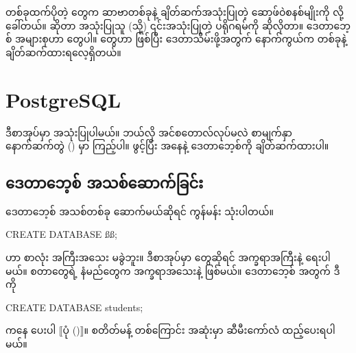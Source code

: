 တစ်ခုထက်ပိုတဲ့  တွေက ဆာဗာတစ်ခုနဲ့ ချိတ်ဆက်အသုံးပြုတဲ့ ဆော့ဖ်ဝဲစနစ်မျိုးကို   လို့ ခေါ်တယ်။  ဆိုတာ အသုံးပြုသူ  (သို့) ၎င်းအသုံးပြုတဲ့ ပရိုဂရမ်ကို ဆိုလိုတာ။ ဒေတာဘေ့စ်  အများစုဟာ  တွေပါ။  တွေဟာ  ဖြစ်ပြီး ဒေတာသိမ်းဖို့အတွက် နောက်ကွယ်က  တစ်ခုနဲ့ ချိတ်ဆက်ထားရလေ့ရှိတယ်။ 


\section{PostgreSQL}
ဒီစာအုပ်မှာ  အသုံးပြုပါမယ်။  ဘယ်လို အင်စတောလ်လုပ်မလဲ စာမျက်နှာ \fRefNo{\pageref{apdx3}} နောက်ဆက်တွဲ (\fRefNo{\ref{apdx3}}) မှာ ကြည့်ပါ။  ဖွင့်ပြီး  အနေနဲ့  ဒေတာဘေ့စ်ကို ချိတ်ဆက်ထားပါ။

\subsection*{ဒေတာဘေ့စ် အသစ်ဆောက်ခြင်း}
ဒေတာဘေ့စ် အသစ်တစ်ခု ဆောက်မယ်ဆိုရင်   ကွန်မန်း သုံးပါတယ်။  
%
\begin{sql}
CREATE DATABASE ßß;
\end{sql}
%
 ဟာ စာလုံး အကြီးအသေး မခွဲဘူး။ ဒီစာအုပ်မှာ  တွေဆိုရင် အက္ခရာအကြီးနဲ့ ရေးပါမယ်။  စတာတွေရဲ့ နံမည်တွေက အက္ခရာအသေးနဲ့ ဖြစ်မယ်။
 ဒေတာဘေ့စ် အတွက် ဒီ  ကို
%
\begin{sql}
CREATE DATABASE students;
\end{sql}
%
 ကနေ  ပေးပါ $\big\llbracket$ပုံ (\fRefNo{\ref{fig:createdb}})$\big\rrbracket$။  စတိတ်မန့် တစ်ကြောင်း အဆုံးမှာ ဆီမီးကော်လံ \fEn{(\fCode{;})} ထည့်ပေးရပါမယ်။

\begin{figure}[tb!]
\caption{}
\label{fig:createdb}
\end{figure}

